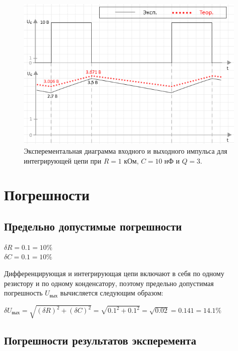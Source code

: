 \begin{figure}[H]
	\begin{center}
		\includegraphics[width=14cm]{img/q3_with_theory}
		\caption{Эксперементальная диаграмма входного и выходного импульса для интегрирующей цепи при $R = 1$ кОм, $C = 10$ нФ и $Q = 3$.}
		\label{i:3} %
	\end{center}
\end{figure}

\section{Погрешности}

\subsection{Предельно допустимые погрешности}

\begin{center}
$\delta R = 0.1 = 10\%$\\
$\delta C = 0.1 = 10\%$\\
\end{center}

Дифференцирующая и интегрирующая цепи включают в себя по одному резистору и по одному конденсатору, поэтому предельно допустимая погрешность $U_\text{вых}$ вычисляется следующим образом:


$\delta U_\text{вых} = \sqrt{(\delta R)^2 + (\delta C)^2} = \sqrt{0.1^2 + 0.1^2} = \sqrt{0.02} = 0.141 = 14.1 \%$

\subsection{Погрешности результатов эксперемента} %

